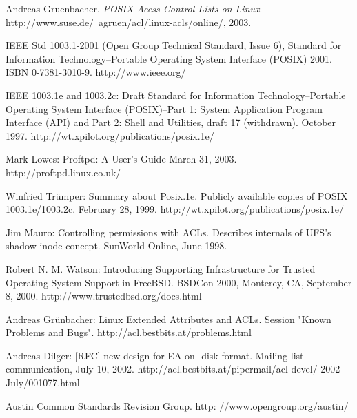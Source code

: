 \begin{thebibliography}{9}
 
  Andreas Gruenbacher,
  \emph{POSIX Acess Control Lists on Linux}.
  http://www.suse.de/~agruen/acl/linux-acls/online/,
  2003.

    IEEE Std 1003.1-2001 (Open Group Technical Standard, Issue 6), 
	Standard for Information Technology--Portable Operating System Interface (POSIX) 2001. 
	ISBN 0-7381-3010-9. 
	http://www.ieee.org/

    IEEE 1003.1e and 1003.2c: Draft Standard for Information Technology--Portable Operating System Interface (POSIX)--Part 1: System Application Program Interface (API) and Part 2: Shell and Utilities, draft 17 (withdrawn). 
	October 1997. 
	http://wt.xpilot.org/publications/posix.1e/

	Mark Lowes: 
	Proftpd: 
	A User's Guide March 31, 2003. 
	http://proftpd.linux.co.uk/

    Winfried Trümper: Summary about Posix.1e. Publicly available copies of POSIX 1003.1e/1003.2c. February 28, 1999. http://wt.xpilot.org/publications/posix.1e/

	Jim Mauro: Controlling permissions with ACLs. Describes internals of UFS's shadow inode concept. SunWorld Online, June 1998.

	Robert N. M. Watson: Introducing Supporting Infrastructure for Trusted Operating System Support in FreeBSD. BSDCon 2000, Monterey, CA, September 8, 2000. http://www.trustedbsd.org/docs.html
	
	Andreas Grünbacher: Linux Extended Attributes and ACLs. Session "Known Problems and Bugs". http://acl.bestbits.at/problems.html
	
	Andreas Dilger: [RFC] new design for EA on- disk format. Mailing list communication, July 10, 2002. http://acl.bestbits.at/pipermail/acl-devel/ 2002-July/001077.html
	
	Austin Common Standards Revision Group. http: //www.opengroup.org/austin/

\end{thebibliography}


